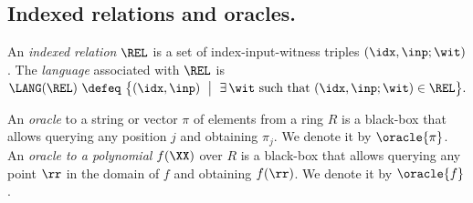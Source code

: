 \subsection{Indexed relations and oracles.}
\label{sec:zinc-polynomial-commitments}


An \emph{indexed relation} $\REL$ is a set of index-input-witness triples $(\idx,\inp;\wit)$. The \emph{language} associated with $\REL$ is
\(
  \LANG(\REL)\ \defeq\ \bigl\{(\idx,\inp)\ \bigm|\ \exists\,\wit \text{ such that } (\idx,\inp;\wit)\in\REL\bigr\}.
\)



An \emph{oracle} to a string or vector $\pi$ of elements from a ring $R$ is a black-box that allows querying any position $j$ and obtaining $\pi_j$. We denote it by $\oracle{\pi}$. 
An \emph{oracle to a polynomial} $f(\XX)$ over $R$ is a black-box that allows querying any point $\rr$ in the domain of $f$ and obtaining $f(\rr)$. We denote it by $\oracle{f}$.




